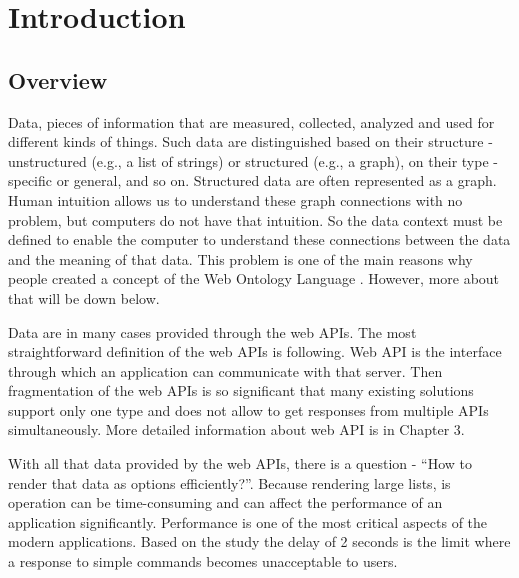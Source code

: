 
\chapter{Introduction} %

\label{Chapter1} %


\section{Overview}

Data, pieces of information that are measured, collected, analyzed and used for different kinds of things. Such data are distinguished based on their structure - unstructured (e.g., a list of strings) or structured (e.g., a graph), on their type - specific or general, and so on. Structured data are often represented as a graph. Human intuition allows us to understand these graph connections with no problem, but computers do not have that intuition. So the data context must be defined to enable the computer to understand these connections between the data and the meaning of that data. This problem is one of the main reasons why people created a concept of the Web Ontology Language \parencite{OWL}. However, more about that will be down below.


Data are in many cases provided through the web APIs. The most straightforward definition of the web APIs is following.
Web API is the interface through which an application can communicate with that server. Then fragmentation of the web APIs is so significant that many existing solutions support only one type
and does not allow to get responses from multiple APIs simultaneously. More detailed
information about web API is in Chapter 3.


With all that data provided by the web APIs, there is a question - “How to render that data as options efficiently?”.  Because rendering large lists, is operation can be time-consuming and can affect the performance of an application significantly. Performance is one of the most critical aspects of the modern applications. Based on the study \parencite{Tolarance_study} the delay of 2 seconds is the limit where a response to simple commands becomes unacceptable to users.


